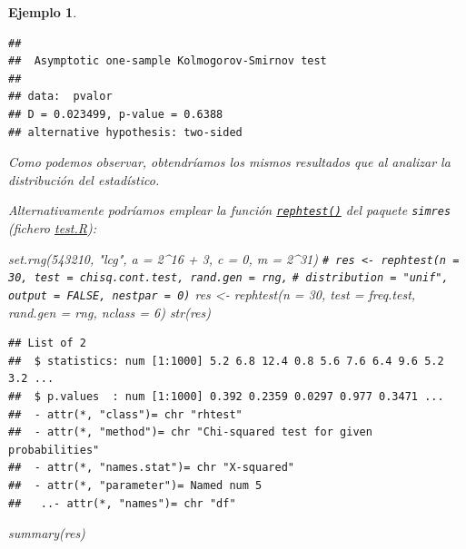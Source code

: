 \documentclass[
]{book}
\newenvironment{Shaded}{\begin{snugshade}}{\end{snugshade}}
\newcommand{\AttributeTok}[1]{\textcolor[rgb]{0.77,0.63,0.00}{#1}}
\newcommand{\CommentTok}[1]{\textcolor[rgb]{0.56,0.35,0.01}{\textit{#1}}}
\newcommand{\DecValTok}[1]{\textcolor[rgb]{0.00,0.00,0.81}{#1}}
\newcommand{\FunctionTok}[1]{\textcolor[rgb]{0.00,0.00,0.00}{#1}}
\newcommand{\NormalTok}[1]{#1}
\newcommand{\OtherTok}[1]{\textcolor[rgb]{0.56,0.35,0.01}{#1}}
\newcommand{\SpecialCharTok}[1]{\textcolor[rgb]{0.00,0.00,0.00}{#1}}
\newcommand{\StringTok}[1]{\textcolor[rgb]{0.31,0.60,0.02}{#1}}
\theoremstyle{break}
\newtheorem{example}{Ejemplo}[chapter]
\theoremstyle{nonumberplain}
\renewcommand{\CommentTok}[1]{\textcolor[rgb]{0.41,0.41,0.41}{\texttt{#1}}}
\begin{document}
\begin{example}
\begin{verbatim}
## 
##  Asymptotic one-sample Kolmogorov-Smirnov test
## 
## data:  pvalor
## D = 0.023499, p-value = 0.6388
## alternative hypothesis: two-sided
\end{verbatim}

Como podemos observar, obtendríamos los mismos resultados que al analizar la distribución del estadístico.

Alternativamente podríamos emplear la función \href{https://rubenfcasal.github.io/simres/reference/rephtest.html}{\texttt{rephtest()}} del paquete \texttt{simres} (fichero \href{R/test.R}{\emph{test.R}}):

\begin{Shaded}
\begin{Highlighting}[]
\FunctionTok{set.rng}\NormalTok{(}\DecValTok{543210}\NormalTok{, }\StringTok{"lcg"}\NormalTok{, }\AttributeTok{a =} \DecValTok{2}\SpecialCharTok{\^{}}\DecValTok{16} \SpecialCharTok{+} \DecValTok{3}\NormalTok{, }\AttributeTok{c =} \DecValTok{0}\NormalTok{, }\AttributeTok{m =} \DecValTok{2}\SpecialCharTok{\^{}}\DecValTok{31}\NormalTok{)}
\CommentTok{\# res \textless{}{-} rephtest(n = 30, test = chisq.cont.test, rand.gen = rng,}
\CommentTok{\#          distribution = "unif", output = FALSE, nestpar = 0)}
\NormalTok{res }\OtherTok{\textless{}{-}} \FunctionTok{rephtest}\NormalTok{(}\AttributeTok{n =} \DecValTok{30}\NormalTok{, }\AttributeTok{test =}\NormalTok{ freq.test, }\AttributeTok{rand.gen =}\NormalTok{ rng, }\AttributeTok{nclass =} \DecValTok{6}\NormalTok{)}
\FunctionTok{str}\NormalTok{(res)}
\end{Highlighting}
\end{Shaded}

\begin{verbatim}
## List of 2
##  $ statistics: num [1:1000] 5.2 6.8 12.4 0.8 5.6 7.6 6.4 9.6 5.2 3.2 ...
##  $ p.values  : num [1:1000] 0.392 0.2359 0.0297 0.977 0.3471 ...
##  - attr(*, "class")= chr "rhtest"
##  - attr(*, "method")= chr "Chi-squared test for given probabilities"
##  - attr(*, "names.stat")= chr "X-squared"
##  - attr(*, "parameter")= Named num 5
##   ..- attr(*, "names")= chr "df"
\end{verbatim}

\begin{Shaded}
\begin{Highlighting}[]
\FunctionTok{summary}\NormalTok{(res)}
\end{Highlighting}
\end{Shaded}


\end{example}
\end{document}
